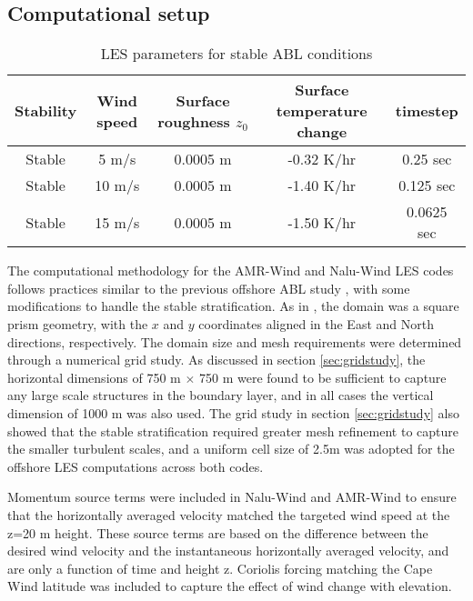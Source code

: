 
\subsection{\label{sec:CFDsetup}Computational setup}

\begin{table}
\caption{\label{tab:z0tempparam} LES parameters for stable ABL conditions}
\centering
\begin{tabular}{ccccc}
  \hline
  Stability & Wind speed & Surface roughness $z_0$ & Surface
  temperature change & timestep\\
  \hline
  Stable       & 5  m/s           & 0.0005 m       & -0.32 K/hr   & 0.25 sec   \\
  Stable       & 10 m/s           & 0.0005 m       & -1.40 K/hr   & 0.125 sec  \\
  Stable       & 15 m/s           & 0.0005 m       & -1.50 K/hr   & 0.0625 sec \\
\hline
\end{tabular}
\end{table}

The computational methodology for the AMR-Wind and Nalu-Wind LES codes
follows practices similar to the previous offshore ABL study \cite{cheung2020large}, with
some modifications to handle the stable stratification.  As in
\cite{cheung2020large}, the domain was a square prism geometry, with
the $x$ and $y$ coordinates aligned in the East and North directions,
respectively.  The domain size and mesh requirements were determined
through a numerical grid study.  As discussed in section
\ref{sec:gridstudy}, the horizontal dimensions of 750 m $\times$ 750 m
were found to be sufficient to capture any large scale structures in
the boundary layer, and in all cases the vertical dimension of 1000 m
was also used.  The grid study in section \ref{sec:gridstudy} also
showed that the stable stratification required greater mesh refinement
to capture the smaller turbulent scales, and a uniform cell size of
2.5m was adopted for the offshore LES computations across both codes.

Momentum source terms were included in Nalu-Wind and AMR-Wind to
ensure that the horizontally averaged velocity matched the targeted
wind speed at the z=20 m height.  These source terms are based on the
difference between the desired wind velocity and the instantaneous
horizontally averaged velocity, and are only a function of time and
height z.  Coriolis forcing matching the Cape Wind latitude was
included to capture the effect of wind change with elevation.

